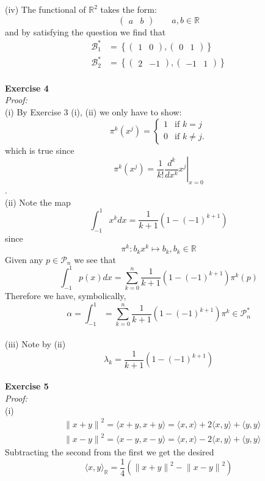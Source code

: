 \documentclass[12pt]{article}
\def\dotp#1#2{\langle#1,#2\rangle}
\def\lam{\lambda}
\begin{document}
(iv) The functional of $\mathbb{R}^2$ takes the form:
\[
\begin{pmatrix}
a&b
\end{pmatrix}
\qquad a,b\in\mathbb{R}
\]
and by satisfying the question we find that 
\begin{align*}
\mathcal{B}_1^*&=\left\{\begin{pmatrix}1&0\end{pmatrix},\begin{pmatrix}0&1\end{pmatrix}\right\}\\
\mathcal{B}_2^*&=\left\{\begin{pmatrix}2&-1\end{pmatrix},\begin{pmatrix}-1&1\end{pmatrix}\right\}
\end{align*}\\[1 em]
{\bf Exercise 4}\\
{\it Proof:}~\\
(i) By Exercise 3 (i), (ii) we only have to show:
\[
\pi^k(x^j)=\begin{cases} 1 &\mbox{if } k= j \\ 
0 & \mbox{if } k \neq j. \end{cases} 
\]
which is true since
\[
\pi^k(x^j)=\left.\frac{1}{k!}\frac{ d^{k}}{ dx^k}x^j \right|_{x=0} 
\].\\[0.5em]
(ii) Note the map
\[
\int_{-1}^{1}x^k dx=\frac{1}{k+1}\left(1-(-1)^{k+1}\right)
\]
since 
\[
\pi^k:b_kx^k\mapsto b_k, b_k\in\mathbb{R}
\]
Given any $p\in\mathcal{P}_n$ we see that
\[
\int_{-1}^{1}p(x) dx=\sum_{k=0}^{n}\frac{1}{k+1}\left(1-(-1)^{k+1}\right)\pi^k(p)
\]
Therefore we have, symbolically, 
\[
\alpha=\int_{-1}^{1}=\sum_{k=0}^{n}\frac{1}{k+1}\left(1-(-1)^{k+1}\right)\pi^k
\in\mathcal{P}^*_n
\]\\[0.5 em]
(iii) Note by  (ii)
\[
\lam_k=\frac{1}{k+1}\left(1-(-1)^{k+1}\right)
\]\\[1 em]
{\bf Exercise 5}\\
{\it Proof:}\\
(i) 
\begin{align*}
&{\|x+y\|}^2=\dotp {x+y}{x+y}=\dotp{x}{x}+2\dotp{x}{y}+\dotp{y}{y}\\
&{\|x-y\|}^2=\dotp {x-y}{x-y}=\dotp{x}{x}-2\dotp{x}{y}+\dotp{y}{y}
\end{align*}
Subtracting the second from the first we get the desired 
\[
\dotp{x}{y}_{\mathbb{R}}=\frac{1}{4}({\|x+y\|}^2-{\|x-y\|}^2)
\]\\[0.5 em]
\end{document}
